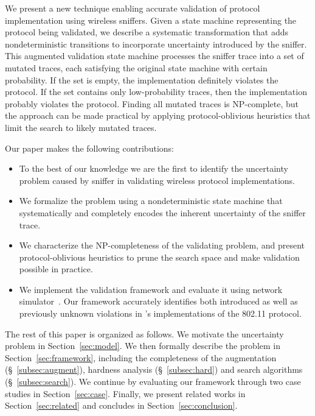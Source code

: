 We present a new technique enabling accurate validation of protocol
implementation using wireless sniffers.
%
Given a state machine representing the protocol being validated, we describe a
systematic transformation that adds nondeterministic transitions to
incorporate uncertainty introduced by the sniffer.
%
This augmented validation state machine processes the sniffer trace into a set
of mutated traces, each satisfying the original state machine with certain
probability.
%
If the set is empty, the implementation definitely violates the protocol.
%
If the set contains only low-probability traces, then the implementation
probably violates the protocol.
%
Finding all mutated traces is NP-complete, but the approach can be made
practical by applying protocol-oblivious heuristics that limit the search to
likely mutated traces.

Our paper makes the following contributions:
%
\begin{itemize}
  \item To the best of our knowledge we are the first to identify the
    uncertainty problem caused by sniffer in validating wireless protocol
    implementations.
  \item We formalize the problem using a nondeterministic state machine that
    systematically and completely encodes the inherent uncertainty of the
    sniffer trace.
    \item We characterize the NP-completeness of the validating problem, and
      present protocol-oblivious heuristics to prune the search
      space and make validation possible in practice.
	\item We implement the validation framework and evaluate it using
    \ns{} network simulator~\cite{riley2010ns}.
    Our framework accurately identifies both introduced as well as previously
    unknown violations in \ns{}'s implementations of the 802.11 protocol.
\end{itemize}

The rest of this paper is organized as follows.
%
We motivate the uncertainty problem in Section~\ref{sec:model}.
%
We then formally describe the problem in Section~\ref{sec:framework},
including the completeness of the augmentation (\S~\ref{subsec:augment}),
hardness analysis (\S~\ref{subsec:hard}) and search algorithms
(\S~\ref{subsec:search}).
%
We continue by evaluating our framework through two case studies in
Section~\ref{sec:case}.  Finally, we present related works in
Section~\ref{sec:related} and concludes in Section~\ref{sec:conclusion}.
